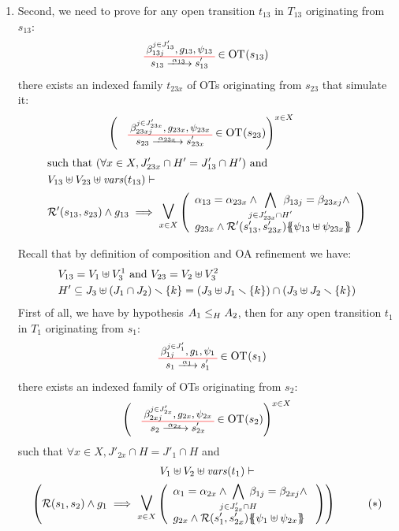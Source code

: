 \documentclass[runningheads]{llncs}
\begin{document}
\begin{enumerate}
\item Second, we need to prove for any open transition $t_{13}$ in $T_{13}$ originating from $s_{13}$:
\begin{align*}
		&  \OTx{13}{}{13}{13} \in \fOT{s_{13}}
\end{align*}		
there exists an indexed family $t_{23x}$ of OTs originating from $s_{23}$ that simulate it: 
\begin{align*}
		&  \mpar{\OTx{23}{x}{23x}{23x} \in \fOT{s_{23}}}^{x \in X}
\end{align*}	
\begin{align*}		
		& \text{such that } \mpar{\forall x \in X, J'_{23x} \cap H' = J'_{13} \cap H'} \text{ and }\\
		&  V_{13} \uplus V_{23} \uplus \fvars{t_{13}} \vdash\\
		& \mathcal{R}'\mpar{s_{13}, s_{23}} \wedge g_{13} \implies \operatorname*{\bigsymb{\bigvee}}_{x \in X} \mpar{\everymath{\displaystyle}\begin{array}{l}
			\alpha_{13} = \alpha_{23x} \wedge \bigwedge_\subbox{j \in J'_{23x} \cap H'} \beta_{13j} = \beta_{23xj} \wedge\\[12pt]
			 g_{23x} \wedge \mathcal{R}'\mpar{s'_{13}, s'_{23x}}\psubst{\psi_{13} \uplus \psi_{23x}}
		\end{array}} 
	\end{align*}


Recall that by definition of composition and OA refinement we have: 
\begin{align*}
&V_{13}= V_1\uplus V^1_3 \text{ and }
V_{23}= V_2\uplus V^2_3\\
& H' \subseteq J_3\uplus \mpar{J_1 \cap J_2} \setminus \{k\} = \mpar{J_3\uplus J_1 \setminus \{k\} } \cap \mpar{J_3\uplus J_2 \setminus \{k\}} \\
\end{align*}
First of all, we have by hypothesis $\wrel{A_1}{A_2}{H}$, then for any open transition $t_1$ in $T_1$  originating from $s_1$:
\begin{align*}
\OTx{1}{}{1}{1} \in \fOT{s_1}
\end{align*}
there exists an indexed family of OTs originating from $s_{2}$: 
\begin{align*}
\mpar{\OTx{2}{x}{2x}{2x} \in \fOT{s_{2}}}^{x \in X} 
\end{align*}
such that $\forall x \in X, J'_{2x} \cap H = J'_1 \cap H$ and
\begin{multline*}
V_1 \uplus V_2 \uplus \fvars{t_1} \vdash\\ \mpar{\mathcal{R}\mpar{s_1, s_{2}} \wedge g_1 \implies \operatorname*{\bigsymb{\bigvee}}_{x \in X} \mpar{\everymath{\displaystyle}
\begin{array}{l}
			\alpha_1 = \alpha_{2x} \wedge \bigwedge_\subbox{j \in J'_{2x} \cap H} \beta_{1j} = \beta_{2xj} \nwedge\\
			 g_{2x} \wedge \mathcal{R}\mpar{s'_1, s'_{2x}}\psubst{\psi_1 \uplus \psi_{2x}}
		\end{array}}}  \qquad \quad (*)
\end{multline*}	
\smallskip


\end{enumerate}
\end{document}
